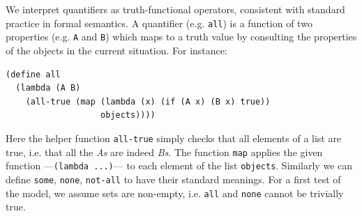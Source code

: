 \documentclass[10pt,letterpaper]{article}
\begin{document}
%



%
%




We interpret quantifiers as truth-functional operators, consistent with standard practice in formal semantics.
A quantifier (e.g. \lstinline{all}) is a function of two properties (e.g. \lstinline{A} and \lstinline{B}) which maps to a truth value by consulting the properties of the objects in the current situation. For instance:
\begin{lstlisting}
(define all 
  (lambda (A B) 
    (all-true (map (lambda (x) (if (A x) (B x) true)) 
                   objects))))
\end{lstlisting}
Here the helper function \lstinline{all-true} simply checks that all elements of a list are true, i.e. that all the \emph{As} are indeed \emph{Bs}. The function \lstinline{map} applies the given function ---\lstinline{(lambda ...)}--- to each element of the list \lstinline{objects}. Similarly we can define \lstinline{some}, \lstinline{none}, \lstinline{not-all} to have their standard meanings. For a first test of the model, we assume sets are non-empty, i.e. \lstinline{all} and \lstinline{none} cannot be trivially true.
\end{document}
